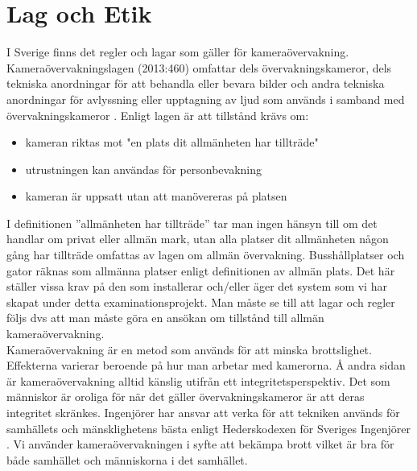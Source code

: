 
\chapter{Lag och Etik} %



\ifpdf
    \graphicspath{{7/figures/PNG/}{7/figures/PDF/}{7/figures/}}
\else
    \graphicspath{{7/figures/EPS/}{7/figures/}}
\fi



I Sverige finns det regler och lagar som gäller för kameraövervakning. Kameraövervakningslagen (2013:460) omfattar dels övervakningskameror, dels tekniska anordningar för att behandla eller bevara bilder och andra tekniska anordningar för avlyssning eller upptagning av ljud som används i samband med övervakningskameror \cite{lansstyrelsen}. 
Enligt lagen är att tillstånd krävs om:

\begin{itemize}
\item kameran riktas mot "en plats dit allmänheten har tillträde"

\item utrustningen kan användas för personbevakning

\item kameran är uppsatt utan att manövereras på platsen
\end{itemize}
I definitionen ”allmänheten har tillträde” tar man ingen hänsyn till om det handlar om privat eller allmän mark, utan alla platser dit allmänheten någon gång har tillträde omfattas av lagen om allmän övervakning. Busshållplatser och gator räknas som allmänna platser enligt definitionen av allmän plats.  Det här ställer vissa krav på den som installerar och/eller äger det system som vi har skapat under detta examinationsprojekt. Man måste se till att lagar och regler följs dvs att man måste göra en ansökan om tillstånd till allmän kameraövervakning.\\
Kameraövervakning är en metod som används för att minska brottslighet. Effekterna varierar beroende på hur man arbetar med kamerorna. Å andra sidan är kameraövervakning alltid känslig utifrån ett integritetsperspektiv. Det som människor är oroliga för när det gäller övervakningskameror är att deras integritet skränkes. Ingenjörer har ansvar att verka för att tekniken används för samhällets och mänsklighetens bästa enligt Hederskodexen för Sveriges Ingenjörer \cite{sverige}. Vi använder kameraövervakningen i syfte att bekämpa brott vilket är bra för både samhället och människorna i det samhället.





